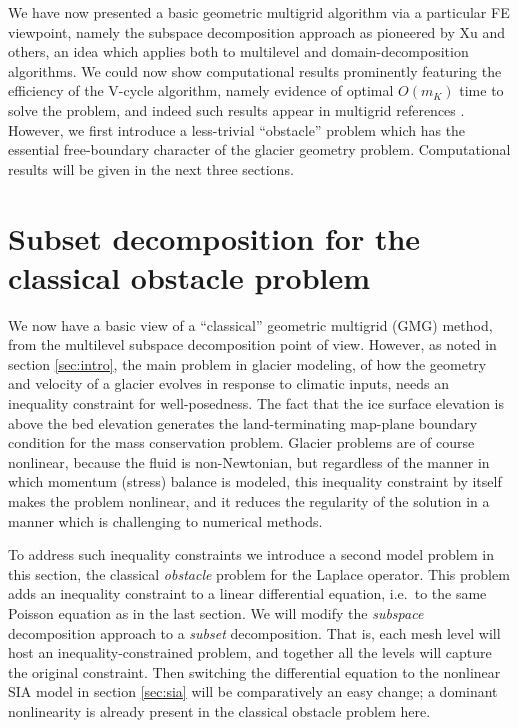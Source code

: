 \documentclass[letterpaper,final,12pt,reqno]{amsart}
\begin{document}
We have now presented a basic geometric multigrid algorithm via a particular FE viewpoint, namely the subspace decomposition approach as pioneered by Xu \cite{Xu1992} and others, an idea which applies both to multilevel and domain-decomposition algorithms.  We could now show computational results prominently featuring the efficiency of the V-cycle algorithm, namely evidence of optimal $O(m_K)$ time to solve the problem, and indeed such results appear in multigrid references \cite{Briggsetal2000,Bueler2021,Elmanetal2014,Trottenbergetal2001}.  However, we first introduce a less-trivial ``obstacle'' problem which has the essential free-boundary character of the glacier geometry problem.  Computational results will be given in the next three sections.


\section{Subset decomposition for the classical obstacle problem} \label{sec:obstacle}

We now have a basic view of a ``classical'' geometric multigrid (GMG) method, from the multilevel subspace decomposition point of view.  However, as noted in section \ref{sec:intro}, the main problem in glacier modeling, of how the geometry and velocity of a glacier evolves in response to climatic inputs, needs an inequality constraint for well-posedness.  The fact that the ice surface elevation is above the bed elevation generates the land-terminating map-plane boundary condition for the mass conservation problem.  Glacier problems are of course nonlinear, because the fluid is non-Newtonian, but regardless of the manner in which momentum (stress) balance is modeled, this inequality constraint by itself makes the problem nonlinear, and it reduces the regularity of the solution in a manner which is challenging to numerical methods.

To address such inequality constraints we introduce a second model problem in this section, the classical \emph{obstacle} problem for the Laplace operator.  This problem adds an inequality constraint to a linear differential equation, i.e.~to the same Poisson equation as in the last section.  We will modify the \emph{subspace} decomposition approach to a \emph{subset} decomposition.  That is, each mesh level will host an inequality-constrained problem, and together all the levels will capture the original constraint.  Then switching the differential equation to the nonlinear SIA model in section \ref{sec:sia} will be comparatively an easy change; a dominant nonlinearity is already present in the classical obstacle problem here.
\end{document}
